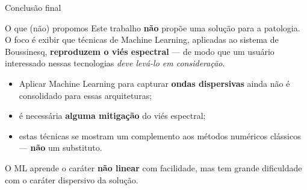 \begin{frame}{Conclusão final}
  \begin{alertblock}{O que (não) propomos}
    Este trabalho \textbf{não} propõe uma solução para a patologia. O foco é
    \alert{exibir} que técnicas de Machine Learning, aplicadas ao sistema de Boussinesq,
    \textbf{reproduzem o viés espectral} --- de modo que um usuário interessado nessas
    tecnologias \emph{deve levá-lo em consideração}.
  \end{alertblock}

  \begin{itemize}
    \item Aplicar Machine Learning para capturar \textbf{ondas dispersivas} ainda \alert{não é
          consolidado} para essas arquiteturas;
    \item é necessária \textbf{alguma mitigação} do viés espectral;
    \item estas técnicas se mostram um \alert{complemento} aos métodos numéricos clássicos
          --- \textbf{não} um substituto.
  \end{itemize}

  \begin{information}
    O ML aprende o caráter \textbf{não linear} com facilidade, mas tem grande
    \alert{dificuldade com o caráter dispersivo} da solução.
  \end{information}
\end{frame}

